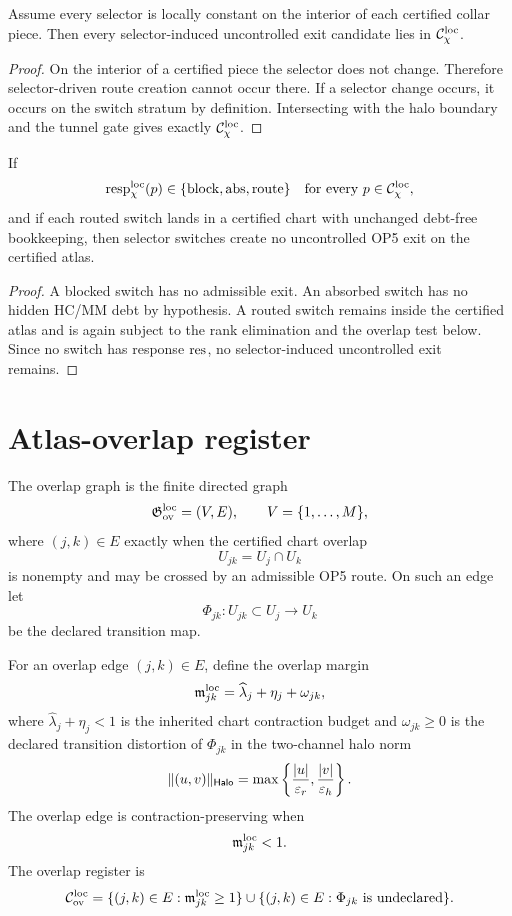 \begin{lemma}
Assume every selector is locally constant on the interior of each certified collar piece. Then every selector-induced uncontrolled exit candidate lies in \(\mathcal C_{\chi}^{\mathrm{loc}}\).
\end{lemma}

\begin{proof}
On the interior of a certified piece the selector does not change. Therefore selector-driven route creation cannot occur there. If a selector change occurs, it occurs on the switch stratum by definition. Intersecting with the halo boundary and the tunnel gate gives exactly \(\mathcal C_{\chi}^{\mathrm{loc}}\).
\end{proof}

\begin{proposition}
If
\[
\mathrm{resp}_{\chi}^{\mathrm{loc}}(p)\in\{\mathrm{block},\mathrm{abs},\mathrm{route}\}
\quad\text{for every }p\in\mathcal C_{\chi}^{\mathrm{loc}},
\]
and if each routed switch lands in a certified chart with unchanged debt-free bookkeeping, then selector switches create no uncontrolled OP5 exit on the certified atlas.
\end{proposition}

\begin{proof}
A blocked switch has no admissible exit. An absorbed switch has no hidden HC/MM debt by hypothesis. A routed switch remains inside the certified atlas and is again subject to the rank elimination and the overlap test below. Since no switch has response \(\mathrm{res}\), no selector-induced uncontrolled exit remains.
\end{proof}

\section{Atlas-overlap register}

\begin{definition}
The overlap graph is the finite directed graph
\[
\mathfrak G_{\mathrm{ov}}^{\mathrm{loc}}=(V,E),
\qquad
V=\{1,\ldots,M\},
\]
where \((j,k)\in E\) exactly when the certified chart overlap
\[
U_{jk}=U_j\cap U_k
\]
is nonempty and may be crossed by an admissible OP5 route. On such an edge let
\[
\Phi_{jk}:U_{jk}\subset U_j\longrightarrow U_k
\]
be the declared transition map.
\end{definition}

\begin{definition}
For an overlap edge \((j,k)\in E\), define the overlap margin
\[
\mathfrak m_{jk}^{\mathrm{loc}}
=
\widehat\lambda_j+\eta_j+\omega_{jk},
\]
where \(\widehat\lambda_j+\eta_j<1\) is the inherited chart contraction budget and \(\omega_{jk}\ge 0\) is the declared transition distortion of \(\Phi_{jk}\) in the two-channel halo norm
\[
\|(u,v)\|_{\mathsf{Halo}}=
\max\left\{\frac{|u|}{\varepsilon_r},\frac{|v|}{\varepsilon_h}\right\}.
\]
The overlap edge is contraction-preserving when
\[
\mathfrak m_{jk}^{\mathrm{loc}}<1.
\]
The overlap register is
\[
\mathcal C_{\mathrm{ov}}^{\mathrm{loc}}=
\{(j,k)\in E:\mathfrak m_{jk}^{\mathrm{loc}}\ge 1\}\cup
\{(j,k)\in E:\Phi_{jk}\text{ is undeclared}\}.
\]
\end{definition}

